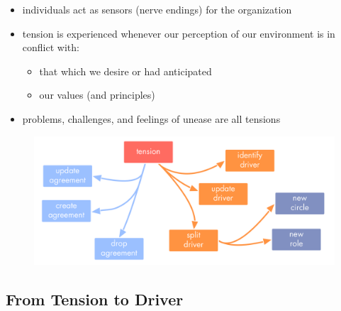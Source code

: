 \begin{itemize}
\item individuals act as sensors (nerve endings) for the organization

\item tension is experienced whenever our perception of our environment is in conflict with:

\begin{itemize}
\item that which we desire or had anticipated

\item our values (and principles)

\end{itemize}

\item problems, challenges, and feelings of unease are all tensions

\end{itemize}

\begin{figure}[htbp]
\centering
\includegraphics[keepaspectratio,width=\textwidth,height=0.75\textheight]{img/tension-driver-domain/navigate-via-tensions.png}
\end{figure}

\subsection{From Tension to Driver}
\label{fromtensiontodriver}

